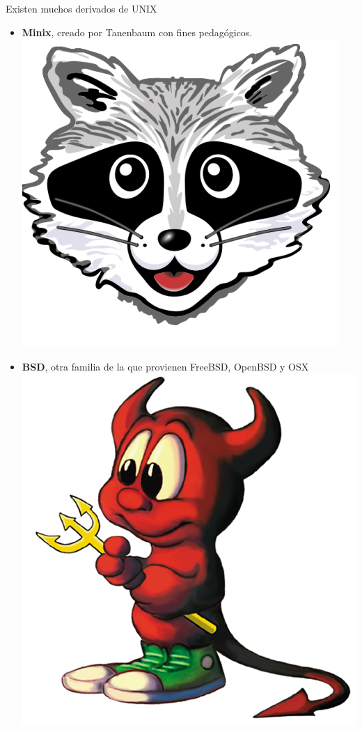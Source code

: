 \documentclass{beamer}
\begin{document}
\begin{frame}{Existen muchos derivados de UNIX}
 \begin{itemize}
 \item \textbf{Minix}, creado por Tanenbaum con fines pedagógicos.
 \includegraphics[scale=0.15]{minix.png}
 \item\textbf{BSD}, otra familia de la que provienen FreeBSD, OpenBSD y OSX
 \includegraphics[scale=0.3]{beastie.png}

\end{itemize}
\end{frame}
\end{document}
